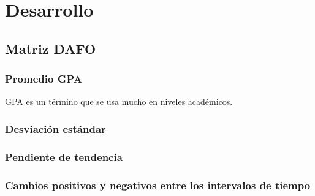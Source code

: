 
\chapter{Desarrollo}
\label{desarrollo}

\section{Matriz DAFO}
\subsection{Promedio GPA}
GPA es un término que se usa mucho en niveles académicos.

\subsection{Desviación estándar}

\subsection{Pendiente de tendencia}

\subsection{Cambios positivos y negativos entre los intervalos de tiempo}